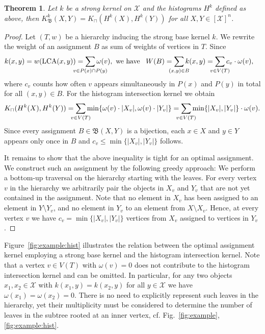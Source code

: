 \documentclass{article}
\newtheorem{theorem}{Theorem}
\newcommand{\X}{\ensuremath{\mathcal{X}}\xspace}
\newcommand{\Assign}{\ensuremath{\mathfrak{B}}\xspace}
\begin{document}
\begin{theorem}\label{thm:strong_hist}
 Let $k$ be a strong kernel on \X and the histograms $H^k$ defined as 
 above, then $K_\Assign^k(X,Y) = K_\sqcap\left(H^k(X),H^k(Y)\right)$ for all $X,Y \in [\X]^n$.
\end{theorem}
\begin{proof}
 Let $(T,w)$ be a hierarchy inducing the strong base kernel $k$.
 We rewrite the weight of an assignment $B$ as sum of weights of vertices in $T$.
 Since
 \begin{align*}
  k(x,y) = 
  w({\rm LCA}(x,y)) = 
  \sum_{\mathclap{v \in P(x) \cap P(y)}} \omega(v),
  \text{ we have }\enskip 
  W(B) &= \sum_{\mathclap{(x,y) \in B}} k(x,y) = 
 \sum_{\mathclap{v \in V(T)}} c_v \cdot \omega(v),
 \end{align*}
 where $c_v$ counts how often $v$ appears simultaneously in $P(x)$ and $P(y)$
 in total for all $(x,y) \in B$.
 For the histogram intersection kernel we obtain
 \begin{align*}
  K_\sqcap(H^k(X),H^k(Y)) 
  = \sum_{\mathclap{v \in V(T)}} \min\{\omega(v) \cdot |X_v|, \omega(v) \cdot |Y_v|\}
  = \sum_{\mathclap{v \in V(T)}} \min\{|X_v|, |Y_v|\} \cdot \omega(v).
 \end{align*}
 Since every assignment $B \in \Assign(X,Y)$ is a bijection, each $x \in X$ and 
 $y \in Y$ appears only once in $B$ and $c_v \leq \min \{ |X_v|, |Y_v| \}$ follows. 

 It remains to show that the above inequality is tight for an optimal assignment.
 We construct such an assignment by the following greedy approach: We perform a bottom-up
 traversal on the hierarchy starting with the leaves. 
 For every vertex $v$ in the hierarchy we arbitrarily pair the objects in $X_v$ 
 and $Y_v$ that are not yet contained in the assignment. Note that no element
 in $X_v$ has been assigned to an element in $Y \setminus Y_v$, and no element 
 in $Y_v$ to an element from $X \setminus X_v$. Hence, at every vertex $v$ we 
 have $c_v = \min\{|X_v|, |Y_v|\}$ vertices from $X_v$ assigned to vertices in 
 $Y_v$. 
\end{proof}

Figure~\ref{fig:example:hist} illustrates the relation between the optimal 
assignment kernel employing a strong base kernel and the histogram intersection
kernel.
Note that a vertex $v \in V(T)$ with $\omega(v)=0$ does not contribute to the
histogram intersection kernel and can be omitted. 
In particular, for any two objects $x_1,x_2 \in \X$ with $k(x_1,y)=k(x_2,y)$ 
for all $y \in \X$ we have $\omega(x_1) = \omega(x_2) = 0$. There is no need
to explicitly represent such leaves in the hierarchy, yet their multiplicity must
be considered to determine the number of leaves in the subtree rooted at an
inner vertex, cf. Fig.~\ref{fig:example}, \ref{fig:example:hist}.
\end{document}
